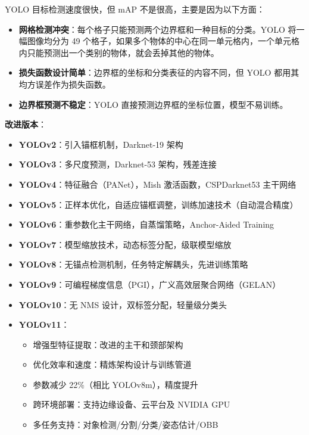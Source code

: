 \documentclass[12pt, a4paper]{article}
\begin{document}
YOLO 目标检测速度很快，但 mAP 不是很高，主要是因为以下方面：

\begin{itemize}
    \item \textbf{网格检测冲突}：每个格子只能预测两个边界框和一种目标的分类。YOLO 将一幅图像均分为 49 个格子，如果多个物体的中心在同一单元格内，一个单元格内只能预测出一个类别的物体，就会丢掉其他的物体。
    
    \item \textbf{损失函数设计简单}：边界框的坐标和分类表征的内容不同，但 YOLO 都用其均方误差作为损失函数。
    
    \item \textbf{边界框预测不稳定}：YOLO 直接预测边界框的坐标位置，模型不易训练。
\end{itemize}

\textbf{改进版本}：
\begin{itemize}
    \item \textbf{YOLOv2}：引入锚框机制，Darknet-19 架构
    \item \textbf{YOLOv3}：多尺度预测，Darknet-53 架构，残差连接
    \item \textbf{YOLOv4}：特征融合（PANet），Mish 激活函数，CSPDarknet53 主干网络
    \item \textbf{YOLOv5}：正样本优化，自适应锚框调整，训练加速技术（自动混合精度）
    \item \textbf{YOLOv6}：重参数化主干网络，自蒸馏策略，Anchor-Aided Training
    \item \textbf{YOLOv7}：模型缩放技术，动态标签分配，级联模型缩放
    \item \textbf{YOLOv8}：无锚点检测机制，任务特定解耦头，先进训练策略
    \item \textbf{YOLOv9}：可编程梯度信息（PGI），广义高效层聚合网络（GELAN）
    \item \textbf{YOLOv10}：无 NMS 设计，双标签分配，轻量级分类头
    \item \textbf{YOLOv11}：
    \begin{itemize}
        \item 增强型特征提取：改进的主干和颈部架构
        \item 优化效率和速度：精炼架构设计与训练管道
        \item 参数减少 22\%（相比 YOLOv8m），精度提升
        \item 跨环境部署：支持边缘设备、云平台及 NVIDIA GPU
        \item 多任务支持：对象检测/分割/分类/姿态估计/OBB
    \end{itemize}
\end{itemize}
\end{document}
